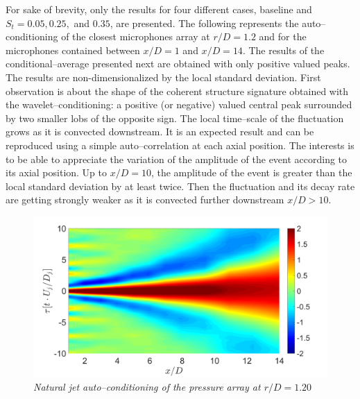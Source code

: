 For sake of brevity, only the results for four different cases, baseline and $S_t = 0.05, 0.25,$ and $0.35$, are presented.
The following  represents the auto--conditioning of the closest microphones array at $r/D = 1.2$ and for the microphones contained between $x/D=1$ and $x/D=14$.
The results of the conditional--average presented next are obtained with only positive valued peaks.
The results are non-dimensionalized by the local standard deviation.
First observation is about the shape of the coherent structure signature obtained with the wavelet--conditioning: a positive (or negative) valued central peak surrounded by two smaller lobs of the opposite sign.
The local time--scale of the fluctuation grows as it is convected downstream.
It is an expected result and can be reproduced using a simple auto--correlation at each axial position.
The interests is to be able to appreciate the variation of the amplitude of the event according to its axial position.
Up to $x/D=10$, the amplitude of the event is greater than the local standard deviation by at least twice.
Then the fluctuation and its decay rate are getting strongly weaker as it is convected further downstream $x/D > 10$. 

\begin{figure}
	\centering
	\includegraphics[width=1\textwidth]{Figures/conditioning/autoCondSt0p00.png}
	\caption{\textit{Natural jet auto--conditioning of the pressure array at $r/D = 1.20$}}
	\label{fig:autoCondSt0p00}
\end{figure}

